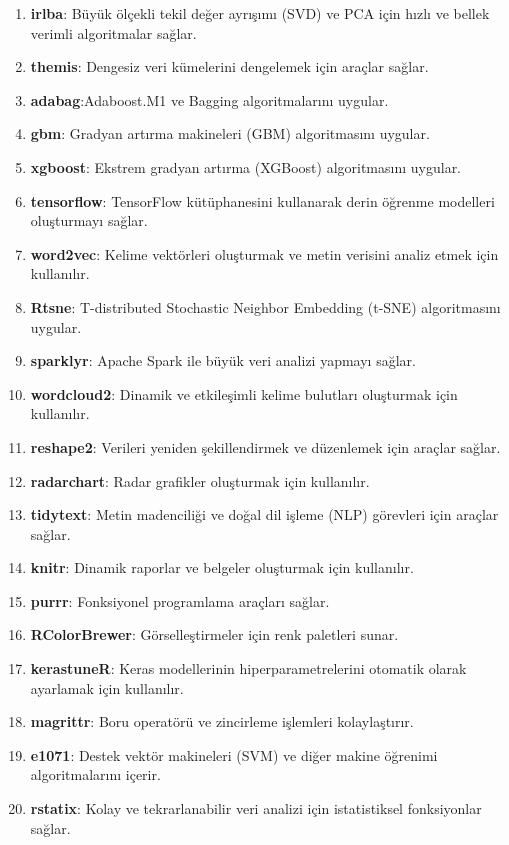 \begin{enumerate}
    \item \textbf{irlba}: Büyük ölçekli tekil değer ayrışımı (SVD) ve PCA için hızlı ve bellek verimli algoritmalar sağlar.
    \item \textbf{themis}: Dengesiz veri kümelerini dengelemek için araçlar sağlar.
    \item \textbf{adabag}:Adaboost.M1 ve Bagging algoritmalarını uygular.
    \item \textbf{gbm}: Gradyan artırma makineleri (GBM) algoritmasını uygular.
    \item \textbf{xgboost}: Ekstrem gradyan artırma (XGBoost) algoritmasını uygular.
    \item \textbf{tensorflow}: TensorFlow kütüphanesini kullanarak derin öğrenme modelleri oluşturmayı sağlar.
    \item \textbf{word2vec}: Kelime vektörleri oluşturmak ve metin verisini analiz etmek için kullanılır.
    \item \textbf{Rtsne}: T-distributed Stochastic Neighbor Embedding (t-SNE) algoritmasını uygular.
    \item \textbf{sparklyr}: Apache Spark ile büyük veri analizi yapmayı sağlar.
    \item \textbf{wordcloud2}: Dinamik ve etkileşimli kelime bulutları oluşturmak için kullanılır.
    \item \textbf{reshape2}: Verileri yeniden şekillendirmek ve düzenlemek için araçlar sağlar.
    \item \textbf{radarchart}: Radar grafikler oluşturmak için kullanılır.
    \item \textbf{tidytext}: Metin madenciliği ve doğal dil işleme (NLP) görevleri için araçlar sağlar.
    \item \textbf{knitr}: Dinamik raporlar ve belgeler oluşturmak için kullanılır.
    \item \textbf{purrr}: Fonksiyonel programlama araçları sağlar.
    \item \textbf{RColorBrewer}: Görselleştirmeler için renk paletleri sunar.
    \item \textbf{kerastuneR}: Keras modellerinin hiperparametrelerini otomatik olarak ayarlamak için kullanılır.
    \item \textbf{magrittr}: Boru operatörü ve zincirleme işlemleri kolaylaştırır.
    \item \textbf{e1071}: Destek vektör makineleri (SVM) ve diğer makine öğrenimi algoritmalarını içerir.
    \item \textbf{rstatix}: Kolay ve tekrarlanabilir veri analizi için istatistiksel fonksiyonlar sağlar.

\end{enumerate}
